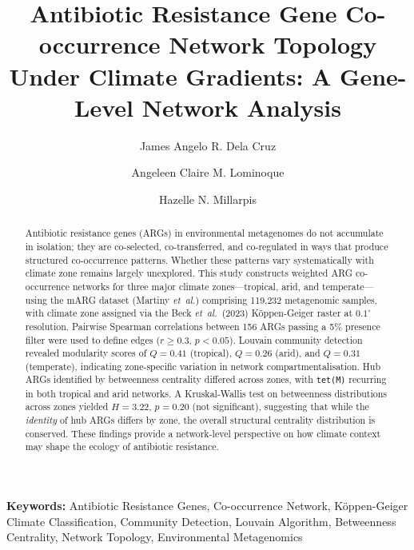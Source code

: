 \documentclass[12pt,a4paper]{article}
\begin{document}
\title{\textbf{Antibiotic Resistance Gene Co-occurrence Network Topology\\
Under Climate Gradients: A Gene-Level Network Analysis}}

\author[1]{James Angelo R. Dela Cruz}
\author[1]{Angeleen Claire M. Lominoque}
\author[1]{Hazelle N. Millarpis}

\date{}
\maketitle


\begin{abstract}
Antibiotic resistance genes (ARGs) in environmental metagenomes do not
accumulate in isolation; they are co-selected, co-transferred, and
co-regulated in ways that produce structured co-occurrence patterns.
Whether these patterns vary systematically with climate zone remains
largely unexplored.
This study constructs weighted ARG co-occurrence networks for three
major climate zones---tropical, arid, and temperate---using the
mARG dataset (Martiny \emph{et~al.}) comprising 119,232 metagenomic
samples, with climate zone assigned via the Beck \emph{et~al.}\ (2023)
K\"oppen-Geiger raster at $0.1^\circ$ resolution.
Pairwise Spearman correlations between 156 ARGs passing a 5\% presence
filter were used to define edges ($r \geq 0.3$, $p < 0.05$).
Louvain community detection revealed modularity scores of
$Q = 0.41$ (tropical), $Q = 0.26$ (arid), and $Q = 0.31$ (temperate),
indicating zone-specific variation in network compartmentalisation.
Hub ARGs identified by betweenness centrality differed across zones,
with \texttt{tet(M)} recurring in both tropical and arid networks.
A Kruskal-Wallis test on betweenness distributions across zones
yielded $H = 3.22$, $p = 0.20$ (not significant), suggesting that
while the \emph{identity} of hub ARGs differs by zone, the overall
structural centrality distribution is conserved.
These findings provide a network-level perspective on how climate context
may shape the ecology of antibiotic resistance.
\end{abstract}

\noindent\textbf{Keywords:} Antibiotic Resistance Genes, Co-occurrence Network,
K\"oppen-Geiger Climate Classification, Community Detection,
Louvain Algorithm, Betweenness Centrality, Network Topology, Environmental Metagenomics
\end{document}
